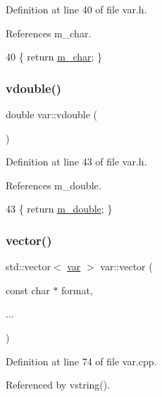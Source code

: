 Definition at line 40 of file var.\+h.



References m\+\_\+char.


\begin{DoxyCode}
40 \{ \textcolor{keywordflow}{return} \hyperlink{classvar_afffb29be23233ae232502023719da1d3}{m\_char}; \} 
\end{DoxyCode}
\mbox{\label{classvar_aabcdbcace1882ed0c6506deabf4eddcb}} 
\subsubsection{\texorpdfstring{vdouble()}{vdouble()}}
{\footnotesize\ttfamily double var\+::vdouble (\begin{DoxyParamCaption}{ }\end{DoxyParamCaption})\hspace{0.3cm}{\ttfamily [inline]}}



Definition at line 43 of file var.\+h.



References m\+\_\+double.


\begin{DoxyCode}
43 \{ \textcolor{keywordflow}{return} \hyperlink{classvar_ad8590162a1dae61824b874c615cce311}{m\_double}; \}
\end{DoxyCode}
\mbox{\label{classvar_a1fe5529702a2697eb8cf69e8f80b0d86}} 
\subsubsection{\texorpdfstring{vector()}{vector()}}
{\footnotesize\ttfamily std\+::vector$<$ \hyperlink{classvar}{var} $>$ var\+::vector (\begin{DoxyParamCaption}\item[{const char $\ast$}]{format,  }\item[{}]{... }\end{DoxyParamCaption})}



Definition at line 74 of file var.\+cpp.



Referenced by vstring().



